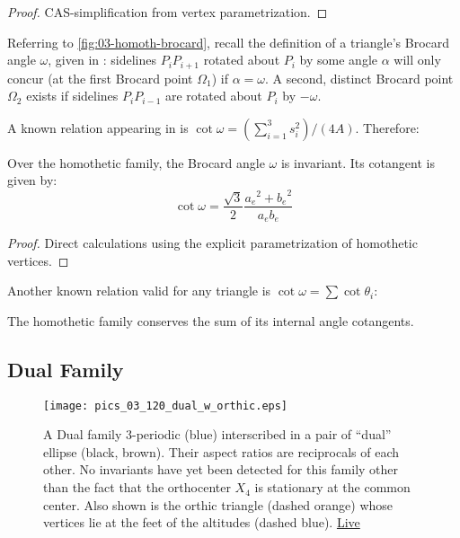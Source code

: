 \begin{proof}
CAS-simplification from vertex parametrization.
\end{proof}

Referring to \cref{fig:03-homoth-brocard}, recall the definition of a triangle's Brocard angle $\omega$, given in \cite[Brocard Angle]{mw}: sidelines $P_i P_{i+1}$ rotated about $P_i$ by some angle $\alpha$ will only concur (at the first Brocard point $\Omega_1$) if $\alpha=\omega$. A second, distinct Brocard point $\Omega_2$ exists if sidelines $P_i P_{i-1}$ are rotated about $P_{i}$ by $-\omega$.

A known relation appearing in \cite[Brocard Angle, Eqn. 2]{mw} is $\cot\omega=(\sum_{i=1}^3 s_i^2)/(4 A)$. Therefore:

\begin{corollary}
Over the homothetic family, the Brocard angle $\omega$ is invariant. Its cotangent is given by:
\[ \cot\omega=\frac{\sqrt{3}}{2} \frac{{a_e}^{2}+{b_e}^{2}}{a_e b_e} \]	
\end{corollary}

\begin{proof}
Direct calculations using the explicit parametrization of homothetic vertices.
\end{proof}

\noindent Another known relation valid for any triangle is $\cot\omega=\sum\cot\theta_i$:

\begin{corollary}
The homothetic family conserves the sum of its internal angle cotangents.
\end{corollary}

\subsection{Dual Family}

\begin{figure}
    \centering
    \texttt{[image: pics\_03\_120\_dual\_w\_orthic.eps]}
    \caption{A Dual family 3-periodic (blue) interscribed in a pair of ``dual'' ellipse (black, brown). Their aspect ratios are reciprocals of each other. No invariants have yet been detected for this family other than the fact that the orthocenter $X_4$ is stationary at the common center. Also shown is the orthic triangle (dashed orange) whose vertices lie at the feet of the altitudes (dashed blue). \href{https://bit.ly/337wTBS}{Live}}
    \label{fig:03-n3-dual}
\end{figure}

